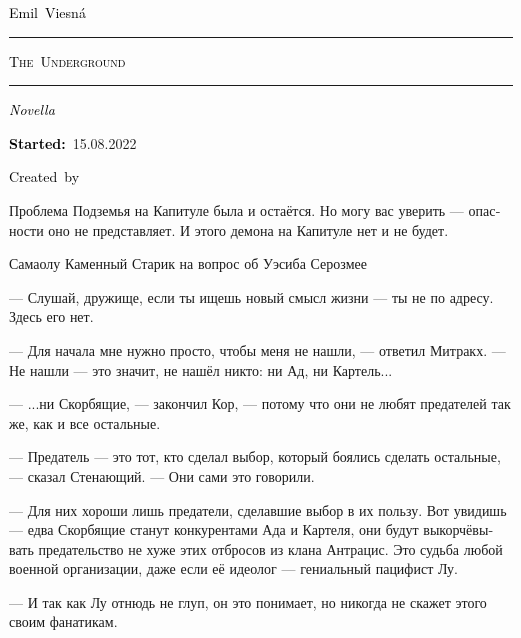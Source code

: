 \documentclass[a4paper,12pt,fleqn]{book}\usepackage{cooltooltips}\usepackage{polyglossia}\setdefaultlanguage[babelshorthands=true]{russian}\setotherlanguage{english}\defaultfontfeatures{Ligatures=TeX,Mapping=tex-text} \usepackage{xcolor}\definecolor{lightgray}{HTML}{bbbbbb}\color{lightgray}\newcommand{\ml}[3]{\textenglish{\textcolor{black}{#3}}}
\newcommand{\tofaauthor}{\ml{$0$}{Эмиль~Весна}{Emil~Viesn\'{a}}}
\newcommand{\tofatitle}{\ml{$0$}{ПОДЗЕМЬЕ}{The~Underground}}
\newcommand{\tofastarted}{15.08.2022}
\newcommand{\asterism}{\vspace{1em}{\centering\Large\bfseries$\ast~\ast~\ast$\par}\vspace{1em}}
\begin{document}

\begin{titlepage}
{\centering{~\par}\vspace{0.25\textheight}
{\LARGE\tofaauthor}\par
\vspace{1.0cm}\rule{17em}{1pt}\par\vspace{0.3cm}
{\Huge\textsc{\tofatitle}\par}
\vspace{0.3cm}\rule{17em}{2pt}\par\vspace{1.0cm}
{\Large\textit{\ml{$0$}{Повесть}{Novella}}\par}
\vspace{0.5cm}\asterism\par\vspace{1.0cm}
{\textbf{\ml{$0$}{Начато:}{Started:}}~\tofastarted\par}\vfill
{\Large\ml{$0$}{Создано~в}{Created~by}~\XeLaTeX}\par}
\end{titlepage}

\tableofcontents

\epigraph
{Проблема Подземья на Капитуле была и остаётся.
Но могу вас уверить --- опасности оно не представляет.
И этого демона на Капитуле нет и не будет.}
{Самаолу Каменный Старик на вопрос об Уэсиба Серозмее}

--- Слушай, дружище, если ты ищешь новый смысл жизни --- ты не по адресу.
Здесь его нет.

--- Для начала мне нужно просто, чтобы меня не нашли, --- ответил Митракх.
--- Не нашли --- это значит, не нашёл никто: ни Ад, ни Картель...

--- ...ни Скорбящие, --- закончил Кор, --- потому что они не любят предателей так же, как и все остальные.

--- Предатель --- это тот, кто сделал выбор, который боялись сделать остальные, --- сказал Стенающий. --- Они сами это говорили.

--- Для них хороши лишь предатели, сделавшие выбор в их пользу.
Вот увидишь --- едва Скорбящие станут конкурентами Ада и Картеля, они будут выкорчёвывать предательство не хуже этих отбросов из клана Антрацис.
Это судьба любой военной организации, даже если её идеолог --- гениальный пацифист Лу.

--- И так как Лу отнюдь не глуп, он это понимает, но никогда не скажет этого своим фанатикам.
\end{document}
